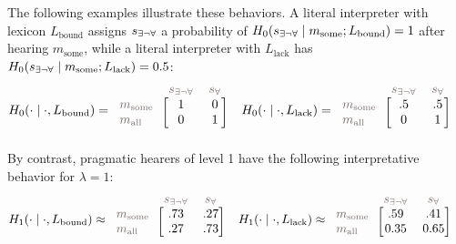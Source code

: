 \documentclass[a4paper, 11pt]{article}
\theoremstyle{Satz}
\newcommand{\state}{\ensuremath{s}\xspace}		%
\newcommand{\mystate}[1]{\ensuremath{\state_{\text{#1}}}\xspace} %
\newcommand{\mylang}[1]{\ensuremath{L_{\text{#1}}}\xspace} %
\newcommand{\messg}{\ensuremath{m}\xspace}		%
\newcommand{\mymessg}[1]{\ensuremath{\messg_{\text{#1}}}\xspace} %
\newcommand{\ssome}{\mystate{\ensuremath{\exists\neg\forall}}}
\newcommand{\sall}{\mystate{\ensuremath{\forall}}}
\newcommand{\msome}{\mymessg{some}}
\newcommand{\mall}{\mymessg{all}}
\newcommand{\Lbound}{\mylang{bound}}
\newcommand{\Llack}{\mylang{lack}}
\newcommand{\mygray}[1]{{\textcolor{mygray}{#1}}}
\begin{document}
The following examples illustrate these behaviors. A literal interpreter with lexicon $\Lbound$ assigns $\ssome$
a probability of $H_0(\ssome \mid \msome; \Lbound) = 1$ after hearing $\msome$, while a literal
interpreter with $\Llack$ has $H_0(\ssome \mid \msome; \Llack) = 0.5$:
\begin{align*}
  H_0(\cdot \mid \cdot, \Lbound) & = \begin{blockarray}{lcc}
    & \mygray{\ssome} & \mygray{\sall} \\
    \begin{block}{l[cc]}
      \mygray{\msome} & 1 & 0 \\
      \mygray{\mall}  & 0 & 1 \\
    \end{block}
  \end{blockarray} &
  H_0(\cdot \mid \cdot, \Llack) & = \begin{blockarray}{lcc}
    & \mygray{\ssome} & \mygray{\sall} \\
    \begin{block}{l[cc]}
      \mygray{\msome} & .5 & .5 \\
      \mygray{\mall}  & 0 & 1 \\
    \end{block}
  \end{blockarray} 
\end{align*}
By contrast, pragmatic hearers of level 1 have the following interpretative behavior for $\lambda = 1$:
\begin{align*}
  H_1(\cdot \mid \cdot, \Lbound) & \approx \begin{blockarray}{lcc}
    & \mygray{\ssome} & \mygray{\sall} \\
    \begin{block}{l[cc]}
      \mygray{\msome} & .73 & .27 \\
      \mygray{\mall}  & .27 & .73 \\
    \end{block}
  \end{blockarray} &
  H_1(\cdot \mid \cdot, \Llack) & \approx \begin{blockarray}{lcc}
    & \mygray{\ssome} & \mygray{\sall} \\
    \begin{block}{l[cc]}
      \mygray{\msome} & .59 & .41 \\
      \mygray{\mall}  & 0.35 & 0.65 \\
    \end{block}
  \end{blockarray} 
\end{align*}
\end{document}
